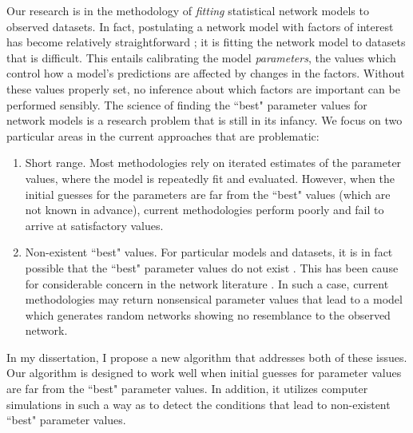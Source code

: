 \documentclass[12pt]{article}
\begin{document}
Our research is in the methodology of \emph{fitting} statistical network models to observed datasets.  
In fact, postulating a network model with factors of interest
has become 
relatively straightforward \citep{Wasserman:1996,Morris:2008}; it is fitting
the network model to datasets that is difficult.  This entails calibrating 
the model \emph{parameters}, the values which control how a model's predictions 
are affected by changes in the factors.  
Without these values properly set,
 no inference about which factors are important can be performed sensibly.
The science of finding the ``best" parameter values for network models 
is a research problem that is still in its infancy.  
We focus on two particular areas in the current approaches that are 
problematic:
\begin{enumerate}
\item Short range.  Most methodologies rely on iterated estimates of the parameter
values, where the model is repeatedly fit and evaluated.  
However, when the initial guesses for the parameters are far from the 
``best" values (which are not known in advance), current 
methodologies perform poorly and fail to arrive at satisfactory values.
\item Non-existent ``best" values.  For particular models and datasets, it is 
in fact possible that the ``best" parameter values do not exist \citep{Handcock:degeneracy,Rinaldo:2009}.  
This has been cause for considerable concern in the network literature 
\citep{Handcock:2006,advancesp*,recentp*}.  In such a case, current 
methodologies may return nonsensical parameter values that lead to a model which generates 
random networks showing no resemblance to the observed network.  
\end{enumerate}
In my dissertation, I propose a new algorithm that addresses both of these 
issues.  Our algorithm is designed to work well when initial 
guesses for parameter values are far from the ``best" parameter values.  In addition, it 
utilizes computer simulations in such a way as 
to detect the conditions that lead to non-existent ``best"  parameter values.

\end{document}
